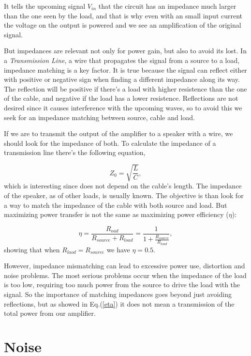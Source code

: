 \documentclass{article}
\begin{document}
{It tells the upcoming signal $V_{in}$ that the circuit has an impedance
much larger than the one seen by the load, and that is why even with an
small input current the voltage on the output is powered and we see an
amplification of the original signal. 

But impedances are relevant not only for power gain, but also to avoid
its lost. In a \emph{Transmission Line}, a wire that propagates the
signal from a source to a load, impedance matching is a key factor. It
is true because the signal can reflect either with  positive or negative
sign when finding a different impedance along its way. The reflection will
be positive if there's a load with higher resistence than the one of the
cable, and negative if the load has a lower resistence. Reflections are
not desired since it causes interference with the upcoming waves, so to
avoid this we seek for an impedance matching between source, cable and
load.

If we are to transmit the output of the amplifier to a speaker with a
wire, we should look for the impedance of both. To calculate the
impedance of a transmission line there's the following equation,

\begin{equation}
Z_{0}=\sqrt{\frac{L}{C}},
\label{g}
\end{equation}
which is interesting since does not depend on the cable's length. The
impedance of the speaker, as of other loads, is usually known. The
objective is than look for a way to match the impedance of the cable
with both source and load. But maximizing power transfer is not the same
as maximizing power efficiency ($\eta$):
  
\begin{equation}
\eta=\frac{R_{oad}}{R_{source}+R_{load}}=\frac{1}{1+\frac{R_{source}}{R_{load}}},
\label{eta}
\end{equation}
showing that when $R_{laod}=R_{source}$ we have $\eta=0.5$.

However, impedance mismatching can lead to excessive power use,
distortion and noise problems. The most serious problems occur when the
impedance of the load is too low, 
requiring too much power from the source to drive the load with the
signal. So the importance of matching impedances goes beyond just
avoiding reflections, but as showed in Eq.(\ref{eta}) it does not mean a
transmission of the total power from our amplifier.

\section{Noise}

}
\end{document}
